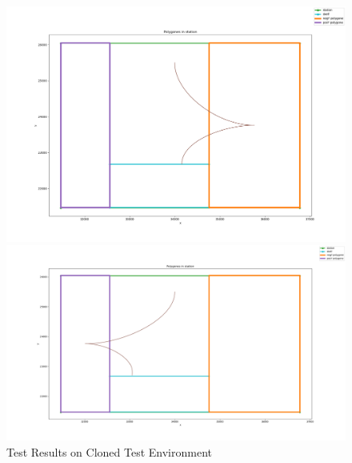 \begin{figure}[H]
    \centering
    \begin{minipage}{0.45\textwidth}
        \centering
        \includegraphics[width=\linewidth]{images/Chap2/spline_split.png} %
    \end{minipage}
    \begin{minipage}{0.45\textwidth}
        \centering
        \includegraphics[width=\linewidth]{images/Chap2/spline_split_posY.png} %
    \end{minipage}
    \caption{Test Results on Cloned Test Environment}
    \label{Test_clone}
\end{figure}

